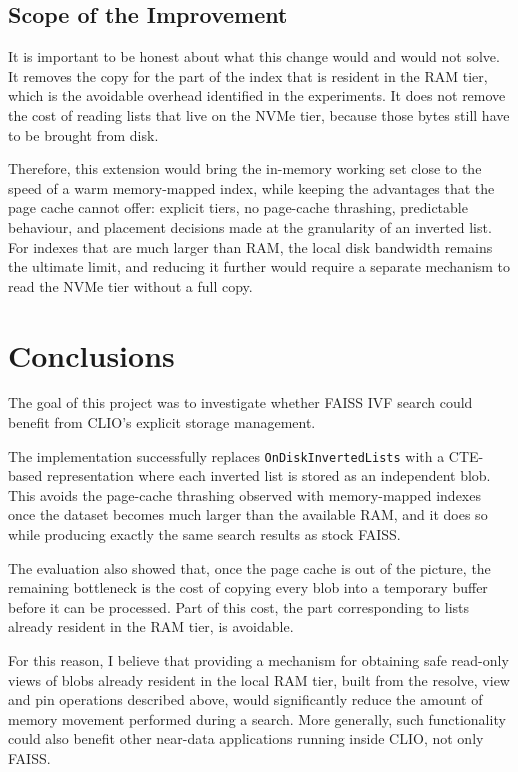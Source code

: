 \documentclass[11pt]{article}
\begin{document}
\subsection{Scope of the Improvement}

It is important to be honest about what this change would and would not
solve. It removes the copy for the part of the index that is resident
in the RAM tier, which is the avoidable overhead identified in the
experiments. It does not remove the cost of reading lists that live on
the NVMe tier, because those bytes still have to be brought from disk.

Therefore, this extension would bring the in-memory working set close
to the speed of a warm memory-mapped index, while keeping the
advantages that the page cache cannot offer: explicit tiers, no
page-cache thrashing, predictable behaviour, and placement decisions
made at the granularity of an inverted list. For indexes that are much
larger than RAM, the local disk bandwidth remains the ultimate limit,
and reducing it further would require a separate mechanism to read the
NVMe tier without a full copy.

\section{Conclusions}

The goal of this project was to investigate whether FAISS IVF search
could benefit from CLIO's explicit storage management.

The implementation successfully replaces \texttt{OnDiskInvertedLists}
with a CTE-based representation where each inverted list is stored as
an independent blob. This avoids the page-cache thrashing observed
with memory-mapped indexes once the dataset becomes much larger than
the available RAM, and it does so while producing exactly the same
search results as stock FAISS.

The evaluation also showed that, once the page cache is out of the
picture, the remaining bottleneck is the cost of copying every blob
into a temporary buffer before it can be processed. Part of this cost,
the part corresponding to lists already resident in the RAM tier, is
avoidable.

For this reason, I believe that providing a mechanism for obtaining
safe read-only views of blobs already resident in the local RAM tier,
built from the resolve, view and pin operations described above, would
significantly reduce the amount of memory movement performed during a
search. More generally, such functionality could also benefit other
near-data applications running inside CLIO, not only FAISS.
\end{document}
